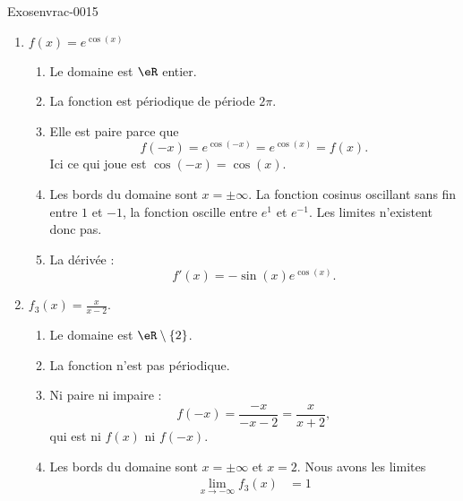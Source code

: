 \begin{corrige}{Exosenvrac-0015}
\begin{enumerate}
\begin{enumerate}
            \end{enumerate}
        \item
            \( f(x)= e^{\cos(x)}\)
            \begin{enumerate}
                \item
                    Le domaine est \( \eR\) entier.
                \item
                   La fonction est p\'eriodique de p\'eriode \( 2\pi\).
                \item
                    Elle est paire parce que
                    \begin{equation}
                        f(-x)= e^{\cos(-x)}= e^{\cos(x)}=f(x).
                    \end{equation}
                    Ici ce qui joue est \( \cos(-x)=\cos(x)\).
                \item
                    Les bords du domaine sont \( x=\pm\infty\). La fonction cosinus oscillant sans fin entre \( 1\) et \( -1\), la fonction oscille entre \(  e^{1}\) et \(  e^{-1}\). Les limites n'existent donc pas.
                \item
                    La dérivée :
                    \begin{equation}
                        f'(x)=-\sin(x) e^{\cos(x)}.
                    \end{equation}
            \end{enumerate}
        \item
            \( f_3(x)=\frac{ x }{ x-2 }\).
            \begin{enumerate}
                \item
                    Le domaine est \( \eR\setminus\{ 2 \}\).
                \item
                    La fonction  n'est pas périodique.
                \item
                    Ni paire ni impaire :
                    \begin{equation}
                        f(-x)=\frac{ -x }{ -x-2 }=\frac{ x }{ x+2 },
                    \end{equation}
                    qui est ni \( f(x)\) ni \( f(-x)\).
                \item
            Les bords du domaine sont \( x=\pm\infty\) et \( x=2\). Nous avons les limites
            \begin{subequations}
                \begin{align}
                    \lim_{x\to -\infty} f_3(x)&=1\\

\end{align}
\end{subequations}
\end{enumerate}
\end{enumerate}
\end{corrige}
